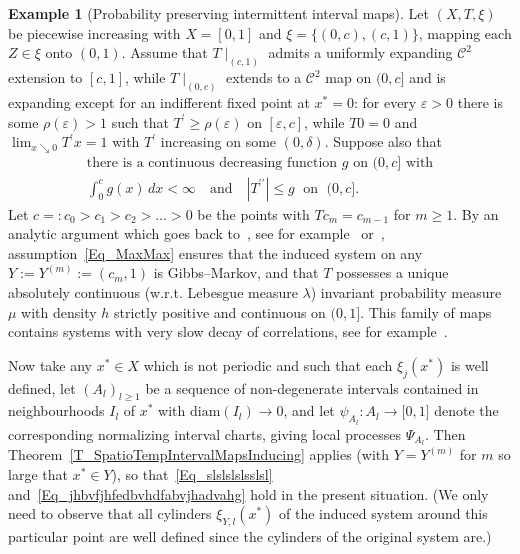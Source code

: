\documentclass[10pt]{amsart}
\theoremstyle{definition}\newtheorem{defi}[theo]{Definition}\newtheorem{rema}[theo]{Remark}\newtheorem{exam}[theo]{Example}\newtheorem{exem}[theo]{Example}\newtheorem{nota}[theo]{Notation}
\newcommand{\clC}{\mathcal{C}}
\newcommand{\diam}{\mathrm{diam}}
\begin{document}
\begin{exam}[{Probability preserving intermittent interval maps}]
Let $(X,T,\xi)$ be piecewise increasing with $X=[0,1]$ and $\xi=\{(0,c),(c,1)\}$, mapping each $Z\in\xi$ onto $(0,1)$. Assume that $T\mid_{(c,1)}$ admits a uniformly expanding $\clC^{2}$ extension to $[c,1]$, while $T\mid_{(0,c)}$ extends to a $\clC^{2}$ map on $(0,c]$ and is expanding except for an indifferent fixed point at $x^{\ast}=0$: for every $\varepsilon>0$ there is some $\rho(\varepsilon)>1$ such that $T^{\prime}\geq\rho(\varepsilon)$ on $[\varepsilon,c]$, while $T0=0$ and $\lim\nolimits_{x\searrow0}T^{\prime}x=1$ with $T^{\prime}$ increasing on some $(0,\delta)$. Suppose also that
\begin{equation}\label{Eq_MaxMax}
\begin{gathered}
\text{there is a continuous decreasing function }g\text{ on }(0,c]\text{ with}\\
\int_{0}^{c}g(x)\,dx<\infty\quad \text{and} \quad\left\vert T^{\prime\prime }\right\vert \leq g\;\text{ on }\;(0,c]. 
\end{gathered}
\end{equation}
Let $c=:c_{0}>c_{1}>c_{2}>\ldots>0$ be the points with $Tc_{m}=c_{m-1}$ for $m\geq1$. By an analytic argument which goes back to~\cite{T1}, see for example~\cite[\S~3]{Z3} or~\cite[\S~4]{T3}, assumption~\eqref{Eq_MaxMax} ensures that the induced system on any $Y:=Y^{(m)}:=(c_{m},1)$ is Gibbs--Markov, and that $T$ possesses a unique absolutely continuous (w.r.t. Lebesgue measure $\lambda$) invariant probability measure $\mu$ with density $h$ strictly positive and continuous on $(0,1]$. This family of maps contains systems with very slow decay of correlations, see for example~\cite{Holland}.

Now take any $x^{\ast}\in X$ which is not periodic and such that each $\xi _{j}(x^{\ast})$ is well defined, let $(A_{l})_{l\geq1}$ be a sequence of non-degenerate intervals contained in neighbourhoods $I_{l}$ of $x^{\ast}$ with $\diam(I_{l})\rightarrow0$, and let $\psi_{A_{l}}:A_{l}
\rightarrow\lbrack0,1]$ denote the corresponding normalizing interval charts, giving local processes $\Psi_{A_{l}}$. Then Theorem~\ref{T_SpatioTempIntervalMapsInducing} applies (with $Y=Y^{(m)}$ for $m$ so large that $x^{\ast}\in Y$), so that~\eqref{Eq_slslslslsslsl} and~\eqref{Eq_jhbvfjhfedbvhdfabvjhadvahg} hold in the present situation. (We only need to observe that all cylinders $\xi_{Y,l}(x^{\ast})$ of the induced system around this particular point are well defined since the cylinders of the original system are.)
\end{exam}
\end{document}
